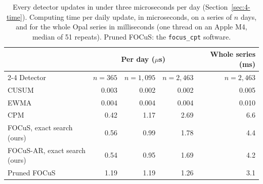 \begin{table}[!h]
\centering
\caption{Every detector updates in under three microseconds per day (Section~\ref{sec:4-time}). Computing time per daily update, in microseconds, on a series of $n$ days, and for the whole Opal series in milliseconds (one thread on an Apple M4, median of 51 repeats). Pruned FOCuS: the \texttt{focus\_cpt} software.}\label{tab:runtime}
\begin{tabular}{@{}lrrrr@{}}
\toprule
 & \multicolumn{3}{c}{Per day ($\mu$s)} & Whole series (ms) \\
\cmidrule(lr){2-4}
Detector & $n=365$ & $n=1{,}095$ & $n=2{,}463$ & $n=2{,}463$ \\
\midrule
CUSUM & 0.003 & 0.002 & 0.002 & 0.005 \\
EWMA & 0.004 & 0.004 & 0.004 & 0.010 \\
CPM & 0.42 & 1.17 & 2.69 & 6.6 \\
FOCuS, exact search (ours) & 0.56 & 0.99 & 1.78 & 4.4 \\
FOCuS-AR, exact search (ours) & 0.54 & 0.95 & 1.69 & 4.2 \\
Pruned FOCuS & 1.19 & 1.19 & 1.26 & 3.1 \\
\bottomrule
\end{tabular}
\end{table}

